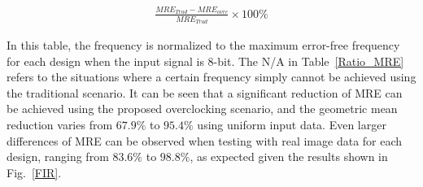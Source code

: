 \documentclass[journal]{IEEEtran}
\begin{document}
\begin{eqnarray}\label{Relative Reduction MRE}
  \frac{MRE_{Trad}-MRE_{ovrc}}{MRE_{Trad}}\times 100\%
\end{eqnarray}

In this table, the frequency is normalized to the maximum error-free frequency for each design when the input signal is 8-bit. The N/A in Table~\ref{Ratio_MRE} refers to the situations where a certain frequency simply cannot be achieved using the traditional scenario. It can be seen that a significant reduction of MRE can be achieved using the proposed overclocking scenario, and the geometric mean reduction varies from $67.9\%$ to $95.4\%$ using uniform input data. Even larger differences of MRE can be observed when testing with real image data for each design, ranging from $83.6\%$ to $98.8\%$, as expected given the results shown in Fig.~\ref{FIR}.
\end{document}
